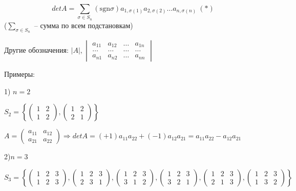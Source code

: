 \begin{equation*} detA = \sum\limits_{\sigma \in S_n} (\mathrm{sgn} \sigma) a_{1, \sigma(1)} a_{2, \sigma(2)} \dots a_{n, \sigma(n)} \ (*)\end{equation*}
($\sum\limits_{\sigma \in S_n}$ -- сумма по всем подстановкам)

\vspace{\baselineskip}
Другие обозначения: $|A|, \begin{vmatrix} a_{11} & a_{12} & \dots & a_{1n} \\ \dots & \dots & \dots & \dots \\ a_{n1} & a_{n2} & \dots & a_{nn} \end{vmatrix}$ 
 
\vspace{\baselineskip}
Примеры: 

1) $n = 2$ 

$S_2 = \left\{ \begin{pmatrix} 1 & 2 \\ 1 & 2 \end{pmatrix}, \begin{pmatrix} 1 & 2 \\ 2 & 1 \end{pmatrix} \right\}$

$A = \begin{pmatrix} a_{11} & a_{12} \\ a_{21} & a_{22} \end{pmatrix} \Rightarrow detA = (+1) a_{11} a_{22} + (-1) a_{12} a_{21} = a_{11} a_{22} - a_{12} a_{21}$

\vspace{\baselineskip}
2)$n = 3$

$S_3 = \left\{ 
\begin{pmatrix} 1 & 2 & 3 \\ 1 & 2 & 3 \end{pmatrix}, 
\begin{pmatrix} 1 & 2 & 3 \\ 2 & 3 & 1 \end{pmatrix}, 
\begin{pmatrix} 1 & 2 & 3 \\ 3 & 1 & 2 \end{pmatrix}, 
\begin{pmatrix} 1 & 2 & 3 \\ 3 & 2 & 1 \end{pmatrix}, 
\begin{pmatrix} 1 & 2 & 3 \\ 2 & 1 & 3 \end{pmatrix}, 
\begin{pmatrix} 1 & 2 & 3 \\ 1 & 3 & 2 \end{pmatrix} \right\}$

